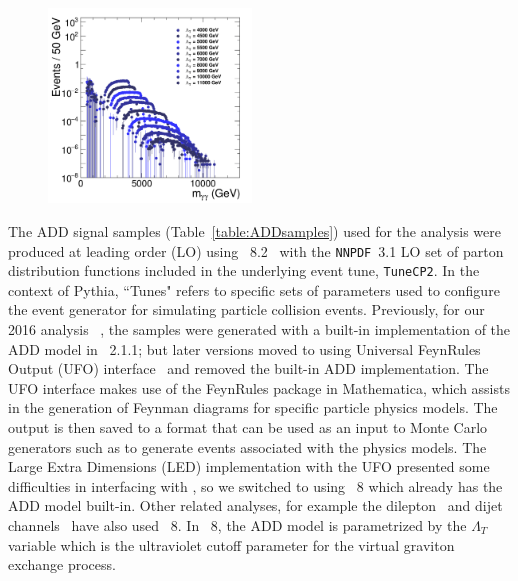 \begin{figure}[htbp!]
\begin{center}
\includegraphics[angle=0,width=0.48\textwidth]{fig/ADDGravToGG_NED-2017_KK-0_bkg_sub-1.png}
\end{center}
\label{fig:ADDsignal}
\end{figure}

The ADD signal samples (Table~\ref{table:ADDsamples}) used for the analysis were produced at leading order (LO) using \PYTHIA~8.2~\cite{Sjostrand:2008za} with the \texttt{NNPDF}~3.1 LO set of parton distribution functions included in the underlying event tune, \texttt{TuneCP2}. In the context of Pythia, ``Tunes" refers to specific sets of parameters used to configure the event generator for simulating particle collision events. Previously, for our 2016 analysis~\cite{Sirunyan:2018wnk} , the samples were generated with a built-in implementation of the ADD model in \SHERPA~2.1.1;  but later \SHERPA versions moved to using Universal FeynRules Output (UFO) interface~\cite{Degrande:2011ua} and removed the built-in ADD implementation. The UFO interface makes use of the FeynRules package in Mathematica, which assists in the generation of Feynman diagrams for specific particle physics models. The output is then saved to a format that can be used as an input to Monte Carlo generators such as \SHERPA to generate events associated with the physics models. The Large Extra Dimensions (LED) implementation with the UFO presented some difficulties in interfacing with \SHERPA, so we switched to using \PYTHIA~8 which already has the ADD model built-in. Other related analyses, for example the dilepton~\cite{CMS:2021ctt, Sirunyan:2019} and dijet channels~\cite{CMS:2017caz} have also used \PYTHIA~8. In \PYTHIA~8, the ADD model is parametrized by the $\Lambda_T$ variable which is the ultraviolet cutoff parameter for the virtual graviton exchange process.


